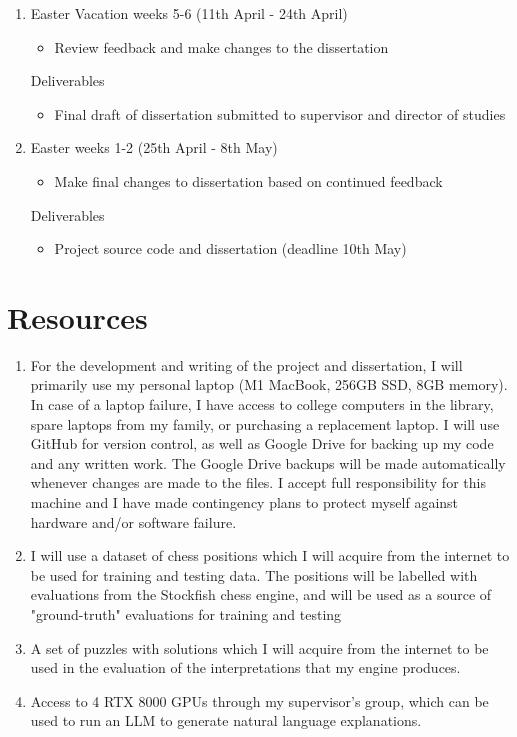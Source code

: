 \documentclass[12pt,a4paper]{article}
\begin{document}
\begin{enumerate}
    \item Easter Vacation weeks 5-6 (11th April - 24th April)
    \begin{itemize}
        \item Review feedback and make changes to the dissertation 
    \end{itemize}
    Deliverables
    \begin{itemize}
        \item Final draft of dissertation submitted to supervisor and director of studies
    \end{itemize}

    \item Easter weeks 1-2 (25th April - 8th May)
    \begin{itemize}
        \item Make final changes to dissertation based on continued feedback
    \end{itemize}
    Deliverables
    \begin{itemize}
        \item Project source code and dissertation (deadline 10th May)
    \end{itemize}

\end{enumerate}

\section*{Resources}
\begin{enumerate}
    \item For the development and writing of the project and dissertation, I will primarily use my personal laptop (M1 MacBook, 256GB SSD, 8GB memory). In case of a laptop failure, I have access to college computers in the library, spare laptops from my family, or purchasing a replacement laptop. I will use GitHub for version control, as well as Google Drive for backing up my code and any written work. The Google Drive backups will be made automatically whenever changes are made to the files. I accept full responsibility for this machine and I have made contingency plans to protect myself against hardware and/or software failure.
    \item I will use a dataset of chess positions which I will acquire from the internet to be used for training and testing data. The positions will be labelled with evaluations from the Stockfish chess engine, and will be used as a source of "ground-truth" evaluations for training and testing
    \item A set of puzzles with solutions which I will acquire from the internet to be used in the evaluation of the interpretations that my engine produces.
    \item Access to 4 RTX 8000 GPUs through my supervisor's group, which can be used to run an LLM to generate natural language explanations.
\end{enumerate}
% 
% 
\end{document}
